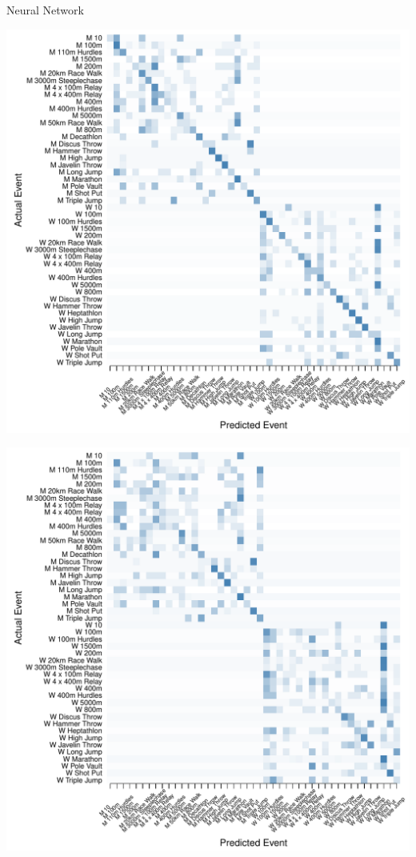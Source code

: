 \documentclass[landscape, paperwidth=42in, paperheight=36in,
fontscale=.35, margin=1in]{baposter}
\begin{document}
\begin{poster}
{\begin{center}
  Neural Network \\
  \begin{minipage}{0.45\textwidth}
    \begin{center}
      \includegraphics[scale=0.27]{../graphics/athletesANN-trn.pdf}
    \end{center}
  \end{minipage}
  \hspace{0.05\textwidth}
  \begin{minipage}{0.45\textwidth}
    \begin{center}
      \includegraphics[scale=0.27]{../graphics/athletesANN-tst.pdf}
    \end{center}
  \end{minipage}
  \end{center}

}
\end{poster}
\end{document}

